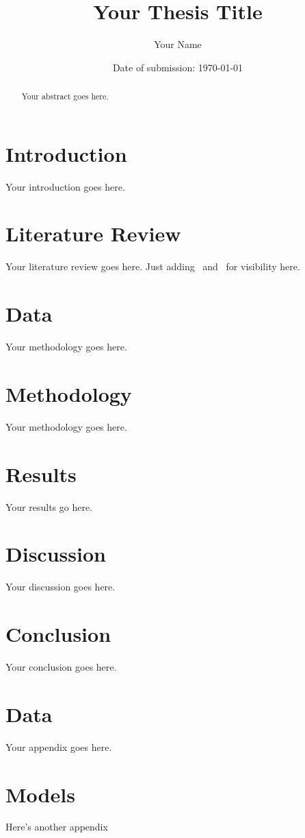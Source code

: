 \documentclass[12pt]{article}
\title{Your Thesis Title}
\author{Your Name}
\date{Date of submission: \today}
\begin{document}

\pagebreak

\begin{abstract}
Your abstract goes here.
\end{abstract}
\pagebreak

\tableofcontents
\pagebreak

\section{Introduction}\label{sect:introduction}
Your introduction goes here.

\section{Literature Review}\label{sect:literature_review}
Your literature review goes here.
Just adding~\parencite{Lagasio2024} and~\parencite{Wu2020} for visibility here.
\parencite{Bingler2022}
\parencite{Bingler2024}
\parencite{Callaway2024}
\parencite{Gourier2024}
\parencite{Ilhan2023}

\section{Data}\label{sect:data}
Your methodology goes here.
\section{Methodology}\label{sect:methodology}
Your methodology goes here.

\section{Results}\label{sect:results}
Your results go here.

\section{Discussion}\label{sect:discussion}
Your discussion goes here.

\section{Conclusion}\label{sect:conclusion}
Your conclusion goes here.

\pagebreak
\printbibliography{}
\pagebreak
\appendix

\section{Data}
Your appendix goes here.

\section{Models}
Here's another appendix
\end{document}
